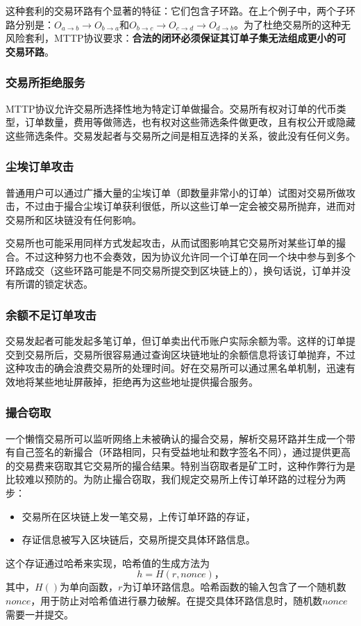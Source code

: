 \documentclass[UTF8,nofonts]{ctexart}
\begin{document}
这种套利的交易环路有个显著的特征：它们包含子环路。在上个例子中，两个子环路分别是：$O_{a\rightarrow b}\rightarrow O_{b\rightarrow a}$和$O_{b\rightarrow c}\rightarrow O_{c\rightarrow d}\rightarrow O_{d\rightarrow b}$。为了杜绝交易所的这种无风险套利，MTTP协议要求：{\bfseries 合法的闭环必须保证其订单子集无法组成更小的可交易环路}。

\subsubsection{交易所拒绝服务}

MTTP协议允许交易所选择性地为特定订单做撮合。交易所有权对订单的代币类型，订单数量，费用等做筛选，也有权对这些筛选条件做更改，且有权公开或隐藏这些筛选条件。交易发起者与交易所之间是相互选择的关系，彼此没有任何义务。

\subsubsection{尘埃订单攻击}
普通用户可以通过广播大量的尘埃订单（即数量非常小的订单）试图对交易所做攻击，不过由于撮合尘埃订单获利很低，所以这些订单一定会被交易所抛弃，进而对交易所和区块链没有任何影响。

交易所也可能采用同样方式发起攻击，从而试图影响其它交易所对某些订单的撮合。不过这种努力也不会奏效，因为协议允许同一个订单在同一个块中参与到多个环路成交（这些环路可能是不同交易所提交到区块链上的），换句话说，订单并没有所谓的锁定状态。

\subsubsection{余额不足订单攻击}

交易发起者可能发起多笔订单，但订单卖出代币账户实际余额为零。这样的订单提交到交易所后，交易所很容易通过查询区块链地址的余额信息将该订单抛弃，不过这种攻击的确会浪费交易所的处理时间。好在交易所可以通过黑名单机制，迅速有效地将某些地址屏蔽掉，拒绝再为这些地址提供撮合服务。

\subsubsection{撮合窃取}

一个懒惰交易所可以监听网络上未被确认的撮合交易，解析交易环路并生成一个带有自己签名的新撮合（环路相同，只有受益地址和数字签名不同），通过提供更高的交易费来窃取其它交易所的撮合结果。特别当窃取者是矿工时，这种作弊行为是比较难以预防的。为防止撮合窃取，我们规定交易所上传订单环路的过程分为两步：
\begin{itemize}
    \item 交易所在区块链上发一笔交易，上传订单环路的存证，
    \item 存证信息被写入区块链后，交易所提交具体环路信息。
\end{itemize}
这个存证通过哈希来实现，哈希值的生成方法为
$$h = H(r, nonce)\text{，}$$
其中，$H()$为单向函数，$r$为订单环路信息。哈希函数的输入包含了一个随机数$nonce$，用于防止对哈希值进行暴力破解。在提交具体环路信息时，随机数$nonce$需要一并提交。
\end{document}
